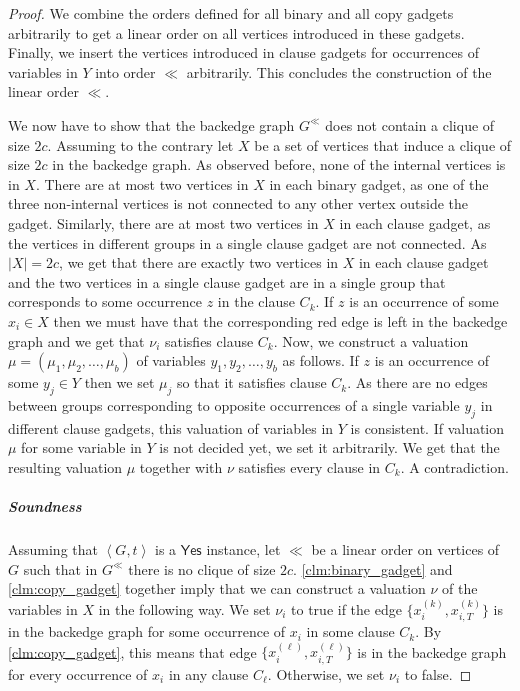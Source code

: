 \documentclass[a4paper,USenglish,cleveref,autoref,thm-restate,pdfa]{lipics-v2021}
\newcommand{\abrac}[1]{\left\langle#1\right\rangle}
\newcommand{\norm}[1]{\left|#1\right|}
\begin{document}
\begin{proof}
    We combine the orders defined for all binary and all copy gadgets arbitrarily to get a linear order on all vertices introduced in these gadgets.
    Finally, we insert the vertices introduced in clause gadgets for occurrences of variables in $Y$ into order $\ll$ arbitrarily.
    This concludes the construction of the linear order $\ll$.

    We now have to show that the backedge graph $G^{\ll}$ does not contain a clique of size $2c$.
    Assuming to the contrary let $X$ be a set of vertices that induce a clique of size $2c$ in the backedge graph.
    As observed before, none of the internal vertices is in $X$.
    There are at most two vertices in $X$ in each binary gadget, as one of the three non-internal vertices is not connected to any other vertex outside the gadget.
    Similarly, there are at most two vertices in $X$ in each clause gadget, as the vertices in different groups in a single clause gadget are not connected.
    As $\norm{X} = 2c$, we get that there are exactly two vertices in $X$ in each clause gadget and the two vertices in a single clause gadget are in a single group that corresponds to some occurrence $z$ in the clause $C_k$.
    If $z$ is an occurrence of some $x_i \in X$ then we must have that the corresponding red edge is left in the backedge graph and we get that $\nu_i$ satisfies clause $C_k$.
    Now, we construct a valuation $\mu=(\mu_1,\mu_2,\ldots,\mu_b)$ of variables $y_1,y_2,\ldots,y_b$ as follows.
    If $z$ is an occurrence of some $y_j \in Y$ then we set $\mu_j$ so that it satisfies clause $C_k$.
    As there are no edges between groups corresponding to opposite occurrences of a single variable $y_j$ in different clause gadgets, this valuation of variables in $Y$ is consistent.
    If valuation $\mu$ for some variable in $Y$ is not decided yet, we set it arbitrarily.
    We get that the resulting valuation $\mu$ together with $\nu$ satisfies every clause in $C_k$.
    A contradiction.

    \subparagraph*{Soundness}
    Assuming that $\abrac{G,t}$ is a $\mathsf{Yes}$ instance,
    let $\ll$ be a linear order on vertices of $G$ such that in \(G^{\ll}\) there is no clique of size \(2c\).
    \cref{clm:binary_gadget} and \cref{clm:copy_gadget} together imply that we can construct a valuation $\nu$ of the variables in $X$ in the following way.
    We set $\nu_i$ to true if the edge $\{x_i^{(k)}, x_{i,T}^{(k)}\}$ is in the backedge graph for some occurrence of $x_i$ in some clause $C_k$.
    By \cref{clm:copy_gadget}, this means that edge $\{x_i^{(\ell)}, x_{i,T}^{(\ell)}\}$ is in the backedge graph for every occurrence of $x_i$ in any clause $C_\ell$.
    Otherwise, we set $\nu_i$ to false.
    

\end{proof}
\end{document}
